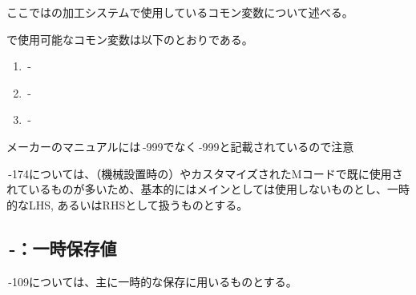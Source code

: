 

ここでは\DMC の加工システムで使用しているコモン変数について述べる。


\DMC で使用可能なコモン変数は以下のとおりである。
\begin{enumerate}[label=\sarrow]
\item {}\,-
\item {}\,-
\item {}\,-
\end{enumerate}
\begin{marker}
メーカーのマニュアルには\,-\ttNum999でなく\,-\ttNum999と記載されているので注意
\end{marker}



\,-\ttNum174については、（機械設置時の）\bundledNCPrg やカスタマイズされたMコードで既に使用されているものが多いため、基本的にはメインとしては使用しないものとし、一時的なLHS, あるいはRHSとして扱うものとする。


\subsection{\,-：一時保存値}
\noindent{}\,-\ttNum109については、主に一時的な保存に用いるものとする。\\

